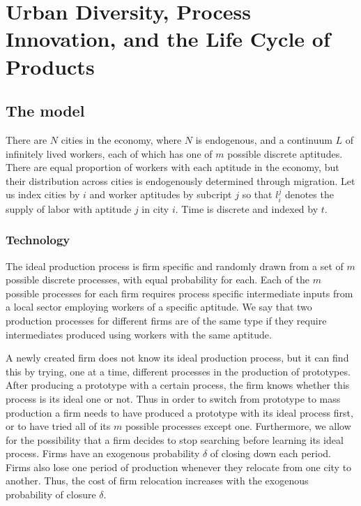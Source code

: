 \chapter{Urban Diversity, Process Innovation, and the Life Cycle of Products}

\section{The model}

There are $N$ cities in the economy, where $N$ is endogenous, and a continuum $L$ of infinitely lived workers, each of which has one of $m$ possible discrete aptitudes. There are equal proportion of workers with each aptitude in the economy, but their distribution across cities is endogenously determined through migration. Let us index cities by $i$ and worker aptitudes by subcript $j$ so that $l_i^j$ denotes the supply of labor with aptitude $j$ in city $i$. Time is discrete and indexed by $t$.

\subsection{Technology}

The ideal production process is firm specific and randomly drawn from a set of $m$ possible discrete processes, with equal probability for each. Each of the $m$ possible processes for each firm requires process specific intermediate inputs from a local sector employing workers of a specific aptitude. We say that two production processes for different firms are of the same type if they require intermediates produced using workers with the same aptitude.

A newly created firm  does not know its ideal production process, but it can find this by trying, one at a time, different processes in the production of prototypes. After producing a prototype with a certain process, the firm knows whether this process is its ideal one or not. Thus in order to switch from prototype to mass production a firm needs to have produced a prototype with its ideal process first, or to have tried all of its $m$ possible processes except one. Furthermore, we allow for the possibility that a firm decides to stop searching before learning its ideal process. Firms have an exogenous probability $\delta$ of closing down each period. Firms also lose one period of production whenever they relocate from one city to another. Thus, the cost of firm relocation increases with the exogenous probability of closure $\delta$.

